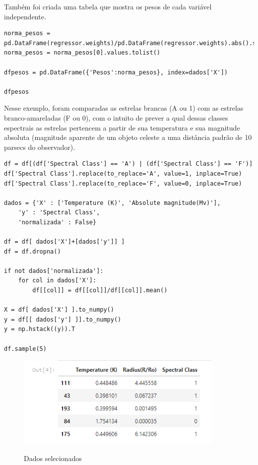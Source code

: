 \documentclass[12pt]{article}
\begin{document}
\vspace{120pt}
Também foi criada uma tabela que mostra os pesos de cada variável independente.\\

\begin{lstlisting}
norma_pesos = pd.DataFrame(regressor.weights)/pd.DataFrame(regressor.weights).abs().sum()
norma_pesos = norma_pesos[0].values.tolist()

dfpesos = pd.DataFrame({'Pesos':norma_pesos}, index=dados['X'])

dfpesos
\end{lstlisting}

Nesse exemplo, foram comparadas as estrelas brancas (A ou 1) com as estrelas branco-amareladas (F ou 0), com o intuito de prever a qual dessas classes espectrais as estrelas pertencem a partir de sua temperatura e sua magnitude absoluta (magnitude aparente de um objeto celeste a uma distância padrão de 10 parsecs do observador).\\

\begin{lstlisting}
df = df[(df['Spectral Class'] == 'A') | (df['Spectral Class'] == 'F')]
df['Spectral Class'].replace(to_replace='A', value=1, inplace=True)
df['Spectral Class'].replace(to_replace='F', value=0, inplace=True)

dados = {'X' : ['Temperature (K)', 'Absolute magnitude(Mv)'],
    'y' : 'Spectral Class',
    'normalizada' : False}

df = df[ dados['X']+[dados['y']] ]
df = df.dropna()

if not dados['normalizada']:
    for col in dados['X']:
        df[[col]] = df[[col]]/df[[col]].mean()

X = df[ dados['X'] ].to_numpy()
y = df[[ dados['y'] ]].to_numpy()
y = np.hstack((y)).T

df.sample(5)
\end{lstlisting}

\begin{figure}[h]
\caption{Dados selecionados}
\centering
\includegraphics[width=10cm]{out1.png}
\label{figura:out1}
\end{figure}
\end{document}
